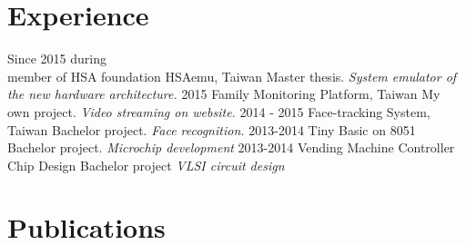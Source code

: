 \documentclass[]{friggeri-cv}
\begin{document}
\section{Experience}

\begin{entrylist}
  \entry
    {Since 2015 during \\
	member of HSA foundation}
    {HSAemu, Taiwan}
    {Master thesis.}
    {\emph{System emulator of the new hardware architecture.}}
  \entry
    {2015}
    {Family Monitoring Platform, Taiwan}
    {My own project.}
    {\emph{Video streaming on website.}}
  \entry
    {2014 - 2015}
    {Face-tracking System, Taiwan}
    {Bachelor project.}
    {\emph{Face recognition.}}
  \entry
    {2013-2014}
	{Tiny Basic on 8051}
    {Bachelor project.}
    {\emph{Microchip development}}
  \entry
    {2013-2014}
	{Vending Machine Controller Chip Design}
    {Bachelor project}
    {\emph{VLSI circuit design}}
\end{entrylist}

\section{Publications}
\end{document}
